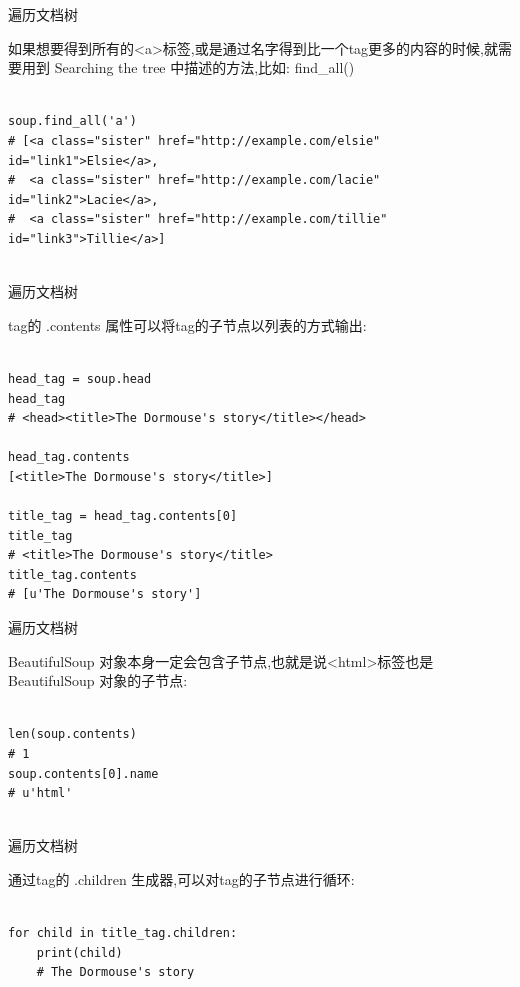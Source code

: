 \documentclass{beamer}
\begin{document}
\begin{frame}[t,fragile]{遍历文档树}

如果想要得到所有的<a>标签,或是通过名字得到比一个tag更多的内容的时候,就需要用到 Searching the tree 中描述的方法,比如: find\_all()

\begin{verbatim}

soup.find_all('a')
# [<a class="sister" href="http://example.com/elsie" id="link1">Elsie</a>,
#  <a class="sister" href="http://example.com/lacie" id="link2">Lacie</a>,
#  <a class="sister" href="http://example.com/tillie" id="link3">Tillie</a>]


\end{verbatim}


\end{frame}

\begin{frame}[t,fragile]{遍历文档树}

tag的 .contents 属性可以将tag的子节点以列表的方式输出:

\begin{verbatim}

head_tag = soup.head
head_tag
# <head><title>The Dormouse's story</title></head>

head_tag.contents
[<title>The Dormouse's story</title>]

title_tag = head_tag.contents[0]
title_tag
# <title>The Dormouse's story</title>
title_tag.contents
# [u'The Dormouse's story']

\end{verbatim}


\end{frame}

\begin{frame}[t,fragile]{遍历文档树}

BeautifulSoup 对象本身一定会包含子节点,也就是说<html>标签也是 BeautifulSoup 对象的子节点:

\begin{verbatim}

len(soup.contents)
# 1
soup.contents[0].name
# u'html'


\end{verbatim}


\end{frame}

\begin{frame}[t,fragile]{遍历文档树}

通过tag的 .children 生成器,可以对tag的子节点进行循环:

\begin{verbatim}

for child in title_tag.children:
    print(child)
    # The Dormouse's story


\end{verbatim}


\end{frame}
\end{document}
